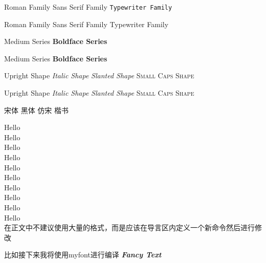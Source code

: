 \documentclass{article}
\newcommand{\myfont}{\textit{\textbf{\textsf{Fancy Text}}}}
\begin{document}
    \textrm{Roman Family}
    \textsf{Sans Serif Family}
    \texttt{Typewriter Family}

    \rmfamily Roman Family
    \sffamily Sans Serif Family
    \ttfamily Typewriter Family

    \textmd{Medium Series}
    \textbf{Boldface Series}

    {\mdseries Medium Series}
    {\bfseries Boldface Series}

    \textup{Upright Shape}
    \textit{Italic Shape}
    \textsl{Slanted Shape}
    \textsc{Small Caps Shape}

    {\upshape Upright Shape}
    {\itshape Italic Shape}
    {\slshape Slanted Shape}
    {\scshape Small Caps Shape}

    {\songti 宋体}\quad
    {\heiti 黑体}\quad
    {\fangsong 仿宋}\quad
    {\kaishu 楷书}
    
    {\tiny          Hello}\\
    {\scriptsize    Hello}\\
    {\footnotesize  Hello}\\
    {\small         Hello}\\
    {\normalsize    Hello}\\
    {\large         Hello}\\
    {\Large         Hello}\\
    {\LARGE         Hello}\\
    {\huge          Hello}\\
    {\Huge          Hello}\\
    
    在正文中不建议使用大量的格式，而是应该在导言区内定义一个新命令然后进行修改
    
    比如接下来我将使用myfont进行编译
    \myfont
\end{document}
